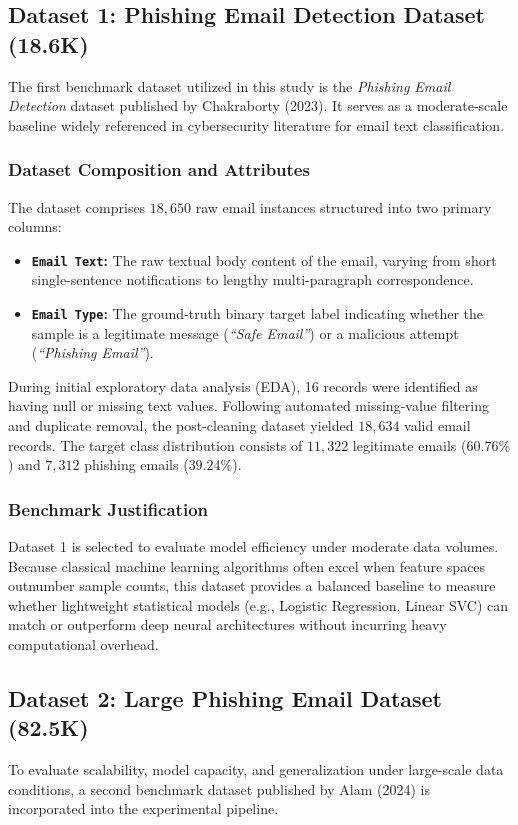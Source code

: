 \documentclass[conference]{IEEEtran}
\begin{document}
\subsection{Dataset 1: Phishing Email Detection Dataset (18.6K)}
The first benchmark dataset utilized in this study is the \textit{Phishing Email Detection} dataset published by Chakraborty (2023). It serves as a moderate-scale baseline widely referenced in cybersecurity literature for email text classification.

\subsubsection{Dataset Composition and Attributes}
The dataset comprises $18,650$ raw email instances structured into two primary columns:
\begin{itemize}
    \item \textbf{\texttt{Email Text}:} The raw textual body content of the email, varying from short single-sentence notifications to lengthy multi-paragraph correspondence.
    \item \textbf{\texttt{Email Type}:} The ground-truth binary target label indicating whether the sample is a legitimate message (\textit{``Safe Email''}) or a malicious attempt (\textit{``Phishing Email''}).
\end{itemize}

During initial exploratory data analysis (EDA), 16 records were identified as having null or missing text values. Following automated missing-value filtering and duplicate removal, the post-cleaning dataset yielded $18,634$ valid email records. The target class distribution consists of $11,322$ legitimate emails ($60.76\%$) and $7,312$ phishing emails ($39.24\%$).

\subsubsection{Benchmark Justification}
Dataset 1 is selected to evaluate model efficiency under moderate data volumes. Because classical machine learning algorithms often excel when feature spaces outnumber sample counts, this dataset provides a balanced baseline to measure whether lightweight statistical models (e.g., Logistic Regression, Linear SVC) can match or outperform deep neural architectures without incurring heavy computational overhead.

\subsection{Dataset 2: Large Phishing Email Dataset (82.5K)}
To evaluate scalability, model capacity, and generalization under large-scale data conditions, a second benchmark dataset published by Alam (2024) is incorporated into the experimental pipeline.
\end{document}
